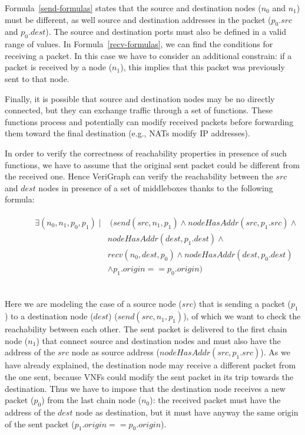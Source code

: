 Formula~\ref{send-formulas} states that the source and destination nodes (\textit{$n_0$} and \textit{$n_1$}) must be different, as well source and destination addresses in the packet (\textit{$p_0.src$} and \textit{$p_0.dest$}). The source and destination ports must also be defined in a valid range of values. In Formula~\ref{recv-formulas}, we can find the conditions for receiving a packet. In this case we have to consider an additional constrain: if a packet is received by a node (\textit{$n_1$}), this implies that this packet was previously sent to that node.   

Finally, it is possible that source and destination nodes may be no directly connected, but they can exchange traffic through a set of functions. These functions process and potentially can modify received packets before forwarding them toward the final destination (e.g., NATs modify IP addresses). 

In order to verify the correctness of reachability properties in presence of such functions, we have to assume that the original sent packet could be different from the received one. Hence VeriGraph can verify the reachability between the \textit{$src$} and \textit{$dest$} nodes in presence of a set of middleboxes thanks to the following formula:
\begin{figure}[h]
	{\footnotesize
		\begin{subequations}
			\begin{align}
				\begin{split}
				\exists (n_{0}, n_{1}, p_{0}, p_{1}) \; |&  \; (send(src, n_{1}, p_{1}) \wedge nodeHasAddr(src, p_{1}.src) \wedge \\
				&  nodeHasAddr(dest, p_{1}.dest) \wedge   \\
				&  recv(n_{0}, dest, p_{0}) \wedge nodeHasAddr(dest, p_{0}.dest) \\
				& \wedge p_{1}.origin == p_{0}.origin )
				\end{split}
			\end{align}
			\label{formula}
		\end{subequations}}
\end{figure}
\\
Here we are modeling the case of a source node (\textit{$src$}) that is sending a packet (\textit{$p_{1}$}) to a destination node (\textit{$dest$}) (\textit{$send(src, n_{1}, p_{1})$}), of which we want to check the reachability between each other. The sent packet is delivered to the first chain node (\textit{$n_{1}$}) that connect source and destination nodes and must also have the address of the \textit{$src$} node as source address (\textit{$nodeHasAddr(src, p_{1}.src)$}). As we have already explained, the destination node may receive a different packet from the one sent, because VNFs could modify the sent packet in its trip towards the destination. Thus we have to impose that the destination node receives a new packet (\textit{$p_{0}$}) from the last chain node (\textit{$n_{0}$}): the received packet  must have the address of the \textit{$dest$} node as destination, but it must have anyway the same origin of the sent packet (\textit{$p_{1}.origin == p_{0}.origin $}).


